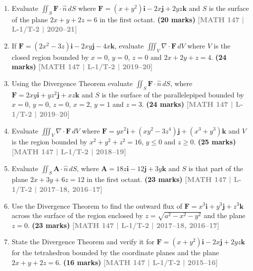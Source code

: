 \documentclass[12pt]{article}
\newcommand{\yr}[1]{\hfill\textcolor{gray}{\small\textbf{[#1]}}}
\newcommand{\mk}[1]{\textcolor{orange!70!black}{\small\textbf{(#1 marks)}}}
\begin{document}
\begin{enumerate}
    
    \item Evaluate $\displaystyle\iint_{S}\mathbf{F}\cdot\hat{n}\,dS$ where $\mathbf{F}=(x+y^{2})\mathbf{i}-2x\mathbf{j}+2yz\mathbf{k}$ and $S$ is the surface of the plane $2x+y+2z=6$ in the first octant.
\mk{20} \yr{MATH 147 | L-1/T-2 | 2020--21}



\item If $\mathbf{F}=(2x^{2}-3z)\mathbf{i}-2xy\mathbf{j}-4x\mathbf{k}$, evaluate $\displaystyle\iiint_{V}\nabla\cdot\mathbf{F}\,dV$ where $V$ is the closed region bounded by $x=0$, $y=0$, $z=0$ and $2x+2y+z=4$.
\mk{24} \yr{MATH 147 | L-1/T-2 | 2019--20}



\item Using the Divergence Theorem evaluate $\displaystyle\iint_{S}\mathbf{F}\cdot\hat{n}\,dS$, where $\mathbf{F}=2xy\mathbf{i}+yz^{2}\mathbf{j}+xz\mathbf{k}$ and $S$ is the surface of the parallelepiped bounded by $x=0$, $y=0$, $z=0$, $x=2$, $y=1$ and $z=3$.
\mk{24} \yr{MATH 147 | L-1/T-2 | 2019--20}



\item Evaluate $\displaystyle\iiint_{V}\nabla\cdot\mathbf{F}\,dV$ where $\mathbf{F}=yx^{2}\mathbf{i}+(xy^{2}-3z^{4})\mathbf{j}+(x^{3}+y^{3})\mathbf{k}$ and $V$ is the region bounded by $x^{2}+y^{2}+z^{2}=16$, $y\le 0$ and $z\ge 0$.
\mk{25} \yr{MATH 147 | L-1/T-2 | 2018--19}



\item Evaluate $\displaystyle\iint_{S}\mathbf{A}\cdot\hat{n}\,dS$, where $\mathbf{A}=18z\mathbf{i}-12\mathbf{j}+3y\mathbf{k}$ and $S$ is that part of the plane $2x+3y+6z=12$ in the first octant.
\mk{23} \yr{MATH 147 | L-1/T-2 | 2017--18, 2016--17}



\item Use the Divergence Theorem to find the outward flux of $\mathbf{F}=x^{3}\mathbf{i}+y^{3}\mathbf{j}+z^{3}\mathbf{k}$ across the surface of the region enclosed by $z=\sqrt{a^{2}-x^{2}-y^{2}}$ and the plane $z=0$.
\mk{23} \yr{MATH 147 | L-1/T-2 | 2017--18, 2016--17}



\item State the Divergence Theorem and verify it for $\mathbf{F}=(x+y^{2})\mathbf{i}-2x\mathbf{j}+2yz\mathbf{k}$ for the tetrahedron bounded by the coordinate planes and the plane $2x+y+2z=6$.
\mk{16} \yr{MATH 147 | L-1/T-2 | 2015--16}



\end{enumerate}
\end{document}
